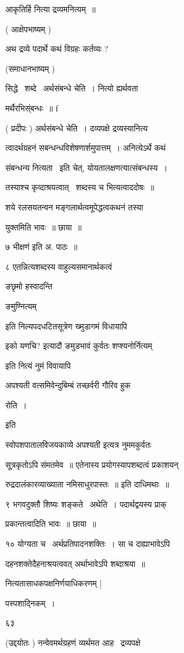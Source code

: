 \documentclass[11pt, openany]{book}
\begin{document}
आकृतिर्हि नित्या द्रव्यमनित्यम्~॥ 

( आक्षेपभाष्यम् ) 

अथ द्रव्ये पदार्थे कथं विग्रहः कर्तव्यः ? 

(समाधानभाष्यम् ) 

सिद्धे \textendash\ शब्दे \textendash\ अर्थसंबन्धे चेति~। नित्यो ह्यर्थवता \textendash\ 

मर्थैरभिस्ंबन्धः~॥ f 

( प्रदीपः ) अर्थसंबन्धे चेति~। दव्यपक्षे द्रव्यस्यानित्य \textendash\ 

त्वादर्थग्रहनं सबन्धन्धविशेषणार्शमुपात्तम्~। अनित्येऽर्थे कथं 

संबन्धन्य नित्यता \textendash\ इति चेत्, योयतालक्षणत्यात्संबन्धस्य~। 

तस्याश्च कृव्दाश्रयत्वात् \textendash\ शब्दस्य च भित्यत्वाददोषः~॥ 

शये रलसयतन्वन मङ्गलार्थत्वमूपेद्धत्वकथनं तस्या 

युक्तमिति भावः~॥ छाया~॥ 

७ भीक्षणं इति अ. पाठः~॥ 

८ एतन्नित्यशब्दस्य वाहुल्यसमानार्थकत्वं {\qt ङछृमो हस्वादन्ति 

ङमुण्नित्यम्} इति निल्यपदधटितसूत्रेण ख्मुडागमं विधायापि 

{\qt इको यणचि}? इत्यादौ ङमुडभावं कुर्वतः {\qt शप्श्यनोर्नित्यम्} 

इति नित्यं नुमं विवायापि 

{\qt अपश्यती वत्समिवेन्दुबिम्बं तच्छर्वरी गौरिव हुक \textendash\ 

रोति~।} इति 

स्वोपशपातालविजयकाव्ये {\qt अपश्यती} इत्यत्र नुममकुर्वतः 

सू्त्रकृतोऽपि संमतमेव~॥ एतेनास्य प्रयोगस्यापशब्दत्वं प्रकाशयन् 

रुद्रदालंकारव्याख्याता नमिसाधुरपास्तः~॥ इति दाधिमथाः~॥ 

९ भगवदुक्तौ शिष्यः शङ्कते \textendash\ अथेति~। पदार्थद्वयस्य प्राक् 

प्रकान्तत्वादिति भावः~॥ छाया~॥ 

१० योग्यता च \textendash\ अर्थप्रतिपादनशक्तिः~। सा च दाह्याभावेऽपि 

 दहनशक्तेदैहनाश्रयत्ववत् अर्थाभावेऽपि शब्दाश्रया~॥ 

नित्यतासाधकपक्षनिर्णयाधिकरणम् ] 

पस्पशाद्निकम्~। 

६३ 



(उद्दयोतः ) नन्वेवमर्थग्रहणं व्यर्थमत आह \textendash\ द्रव्यपक्षे 
\end{document}
